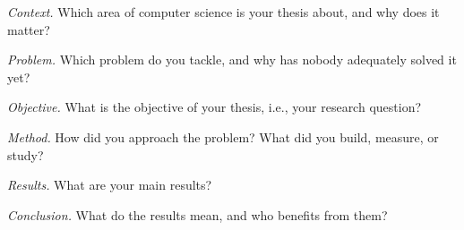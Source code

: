 


\textit{Context.}
Which area of computer science is your thesis about, and why does it matter?

\textit{Problem.}
Which problem do you tackle, and why has nobody adequately solved it yet?

\textit{Objective.}
What is the objective of your thesis, i.e., your research question?

\textit{Method.}
How did you approach the problem?
What did you build, measure, or study?

\textit{Results.}
What are your main results?

\textit{Conclusion.}
What do the results mean, and who benefits from them?
